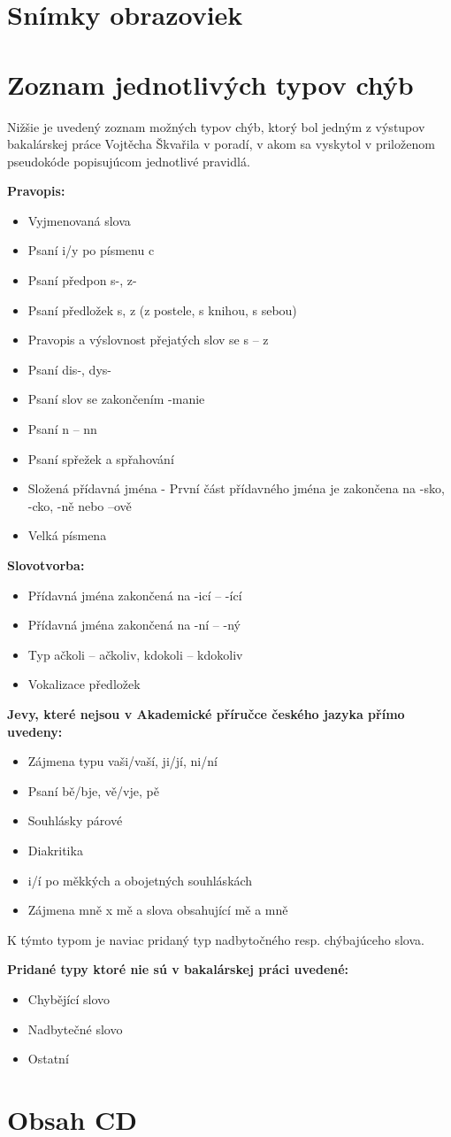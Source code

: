 \documentclass[12pt,oneside]{fithesis2}
\begin{document}
    \chapter{Snímky obrazoviek}
    \chapter{Zoznam jednotlivých typov chýb} \label{typy-chyb}
    \par Nižšie je uvedený zoznam možných typov chýb, ktorý bol jedným z výstupov bakalárskej práce Vojtěcha Škvařila\cite{skvaril14} v poradí, v akom sa vyskytol v priloženom pseudokóde popisujúcom jednotlivé pravidlá.
	\par \bigskip \textbf{Pravopis:}
\begin{itemize}
	\item Vyjmenovaná slova
	\item Psaní i/y po písmenu c
	\item Psaní předpon s-, z-
	\item Psaní předložek s, z (z postele, s knihou, s sebou)
	\item Pravopis a výslovnost přejatých slov se s – z
	\item Psaní dis-, dys-
	\item Psaní slov se zakončením -manie
	\item Psaní n – nn
	\item Psaní spřežek a spřahování
	\item Složená přídavná jména - První část přídavného jména je zakončena na -sko, -cko, -ně nebo –ově
	\item Velká písmena
\end{itemize}
\bigskip
	\textbf{Slovotvorba:}
\begin{itemize}
	\item Přídavná jména zakončená na -icí – -ící
	\item Přídavná jména zakončená na -ní – -ný
	\item Typ ačkoli – ačkoliv, kdokoli – kdokoliv
	\item Vokalizace předložek
\end{itemize}
\bigskip
	\textbf{Jevy, které nejsou v Akademické příručce českého jazyka přímo uvedeny:}
\begin{itemize}
	\item Zájmena typu vaši/vaší, ji/jí, ni/ní
	\item Psaní bě/bje, vě/vje, pě
	\item Souhlásky párové
	\item Diakritika
	\item i/í po měkkých a obojetných souhláskách
	\item Zájmena mně x mě a slova obsahující mě a mně
\end{itemize}

\par K týmto typom je naviac pridaný typ nadbytočného resp. chýbajúceho slova.
\par \bigskip
	\textbf{Pridané typy ktoré nie sú v bakalárskej práci uvedené:}
\begin{itemize}
	\item Chybějící slovo
	\item Nadbytečné slovo
	\item Ostatní
\end{itemize}

\chapter{Obsah CD}
    
\end{document}
